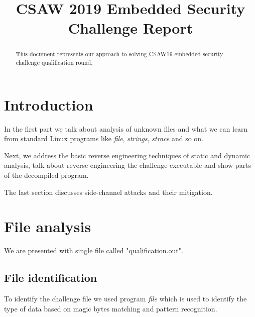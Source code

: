 \documentclass[conference]{IEEEtran}
\begin{document}
\title{CSAW 2019 Embedded Security Challenge Report}

\author{
\and
{}
}

\maketitle

\begin{abstract}
This document represents our approach to solving CSAW19 embedded security challenge qualification round.
\end{abstract}

\section{Introduction}
In the first part we talk about analysis of unknown files and what we can learn from standard Linux programs like \textit{file}, \textit{strings}, \textit{strace} and so on.

Next, we address the basic reverse engineering techniques of static and dynamic analysis, talk about reverse engineering the challenge executable and show parts of the decompiled program.

The last section discusses side-channel attacks and their mitigation.

\section{File analysis}
We are presented with single file called {"qualification.out"}. 
\subsection{File identification}
To identify the challenge file we used program
\textit{file} which is used to identify the type of data based on magic bytes matching and pattern recognition.
\end{document}

